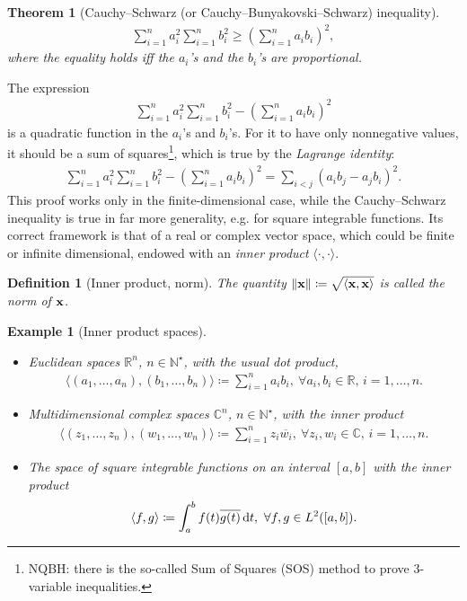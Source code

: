\documentclass[oneside]{book}
\numberwithin{equation}{section}
\newtheorem{definition}{Definition}[section]
\newtheorem{theorem}{Theorem}[section]
\newtheorem{example}{Example}[section]
\begin{document}
\begin{theorem}[Cauchy--Schwarz (or Cauchy--Bunyakovski--Schwarz) inequality]
	\begin{align}
		\boxed{\sum_{i=1}^n a_i^2\sum_{i=1}^n b_i^2\ge\left(\sum_{i=1}^n a_ib_i\right)^2,}
	\end{align}
	where the equality holds iff the $a_i$'s and the $b_i$'s are proportional.
\end{theorem}
The expression
\begin{align*}
	\sum_{i=1}^n a_i^2\sum_{i=1}^n b_i^2 - \left(\sum_{i=1}^n a_ib_i\right)^2
\end{align*}
is a quadratic function in the $a_i$'s and $b_i$'s. For it to have only nonnegative values, it should be a sum of squares\footnote{NQBH: there is the so-called Sum of Squares (SOS) method to prove 3-variable inequalities.}, which is true by the \textit{Lagrange identity}:
\begin{align*}
	\sum_{i=1}^n a_i^2\sum_{i=1}^n b_i^2 - \left(\sum_{i=1}^n a_ib_i\right)^2 = \sum_{i < j} (a_ib_j - a_jb_i)^2.
\end{align*}
This proof works only in the finite-dimensional case, while the Cauchy--Schwarz inequality is true in far more generality, e.g. for square integrable functions. Its correct framework is that of a real or complex vector space, which could be finite or infinite dimensional, endowed with an \textit{inner product} $\langle\cdot,\cdot\rangle$.

\begin{definition}[Inner product, norm]
	The quantity $\|{\bf x}\|\coloneqq\sqrt{\langle{\bf x},{\bf x}\rangle}$ is called the \emph{norm} of ${\bf x}$.
\end{definition}

\begin{example}[Inner product spaces]
	\begin{itemize}
		\item Euclidean spaces $\mathbb{R}^n$, $n\in\mathbb{N}^\star$, with the usual dot product,
		\begin{align*}
			\langle(a_1,\ldots,a_n),(b_1,\ldots,b_n)\rangle\coloneqq\sum_{i=1}^n a_ib_i,\ \forall a_i,b_i\in\mathbb{R},\,i = 1,\ldots,n.
		\end{align*}
		\item Multidimensional complex spaces $\mathbb{C}^n$, $n\in\mathbb{N}^\star$, with the inner product
		\begin{align*}
			\langle(z_1,\ldots,z_n),(w_1,\ldots,w_n)\rangle\coloneqq\sum_{i=1}^n z_i\overline{w_i},\ \forall z_i,w_i\in\mathbb{C},\,i = 1,\ldots,n.
		\end{align*}
		\item The space of square integrable functions on an interval $[a,b]$ with the inner product
		\begin{align*}
			\langle f,g\rangle\coloneqq\int_a^b f(t)\overline{g(t)}\,{\rm d}t,\ \forall f,g\in L^2([a,b]).
		\end{align*}
	\end{itemize}
\end{example}
\end{document}
